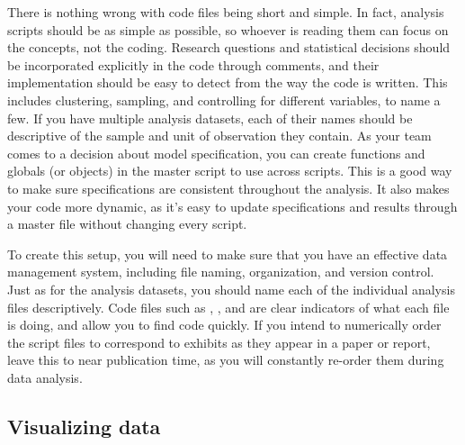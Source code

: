 There is nothing wrong with code files being short and simple.
In fact, analysis scripts should be as simple as possible,
so whoever is reading them can focus on the concepts, not the coding.
Research questions and statistical decisions should be incorporated explicitly in the code through comments,
and their implementation should be easy to detect from the way the code is written.
This includes clustering, sampling, and controlling for different variables, to name a few.
If you have multiple analysis datasets,
each of their names should be descriptive of the sample and unit of observation they contain.
As your team comes to a decision about model specification,
you can create functions and globals (or objects) in the master script to use across scripts.
This is a good way to make sure specifications are consistent throughout the analysis.
It also makes your code more dynamic,
as it's easy to update specifications and results
through a master file without changing every script.

To create this setup, 
you will need to make sure that you have an effective data management system,
including file naming, organization, and version control.
Just as for the analysis datasets,
you should name each of the individual analysis files descriptively.
Code files such as ,
, and 
are clear indicators of what each file is doing, and allow you to find code quickly.
If you intend to numerically order the script files
to correspond to exhibits as they appear in a paper or report,
leave this to near publication time,
as you will constantly re-order them during data analysis.

\subsection{Visualizing data}

